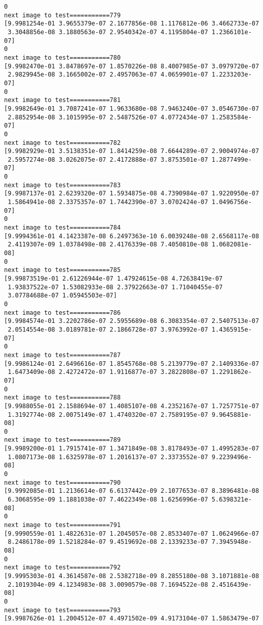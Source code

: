 \documentclass[11pt]{article}
\begin{document}
\begin{Verbatim}[commandchars=\\\{\}]
0
next image to test===========779
[9.9981254e-01 3.9655379e-07 2.1677856e-08 1.1176812e-06 3.4662733e-07
 3.3048856e-08 3.1880563e-07 2.9540342e-07 4.1195804e-07 1.2366101e-07]
0
next image to test===========780
[9.9982470e-01 3.8478697e-07 1.8570226e-08 8.4007985e-07 3.0979720e-07
 2.9829945e-08 3.1665002e-07 2.4957063e-07 4.0659901e-07 1.2233203e-07]
0
next image to test===========781
[9.9982649e-01 3.7087241e-07 1.9633680e-08 7.9463240e-07 3.0546730e-07
 2.8852954e-08 3.1015995e-07 2.5487526e-07 4.0772434e-07 1.2583584e-07]
0
next image to test===========782
[9.9982929e-01 3.5138351e-07 1.8414259e-08 7.6644289e-07 2.9004974e-07
 2.5957274e-08 3.0262075e-07 2.4172888e-07 3.8753501e-07 1.2877499e-07]
0
next image to test===========783
[9.9987137e-01 2.6239320e-07 1.5934875e-08 4.7390984e-07 1.9220950e-07
 1.5864941e-08 2.3375357e-07 1.7442390e-07 3.0702424e-07 1.0496756e-07]
0
next image to test===========784
[9.9994361e-01 4.1423387e-08 6.2497363e-10 6.0039248e-08 2.6568117e-08
 2.4119307e-09 1.0378498e-08 2.4176339e-08 7.4050810e-08 1.0682081e-08]
0
next image to test===========785
[9.99873519e-01 2.61226944e-07 1.47924615e-08 4.72638419e-07
 1.93837522e-07 1.53082933e-08 2.37922663e-07 1.71040455e-07
 3.07784688e-07 1.05945503e-07]
0
next image to test===========786
[9.9984574e-01 3.2202786e-07 2.5955689e-08 6.3083354e-07 2.5407513e-07
 2.0514554e-08 3.0189781e-07 2.1866728e-07 3.9763992e-07 1.4365915e-07]
0
next image to test===========787
[9.9986124e-01 2.6496616e-07 1.8545768e-08 5.2139779e-07 2.1409336e-07
 1.6473409e-08 2.4272472e-07 1.9116877e-07 3.2822808e-07 1.2291862e-07]
0
next image to test===========788
[9.9988055e-01 2.1588694e-07 1.4085107e-08 4.2352167e-07 1.7257751e-07
 1.3192774e-08 2.0075149e-07 1.4740320e-07 2.7589195e-07 9.9645881e-08]
0
next image to test===========789
[9.9989200e-01 1.7915741e-07 1.3471849e-08 3.8178493e-07 1.4995283e-07
 1.0807173e-08 1.6325978e-07 1.2016137e-07 2.3373552e-07 9.2239496e-08]
0
next image to test===========790
[9.9992085e-01 1.2136614e-07 6.6137442e-09 2.1077653e-07 8.3896481e-08
 6.3068595e-09 1.1881038e-07 7.4622349e-08 1.6256996e-07 5.6398321e-08]
0
next image to test===========791
[9.9990559e-01 1.4822631e-07 1.2045057e-08 2.8533407e-07 1.0624966e-07
 8.2486178e-09 1.5218284e-07 9.4519692e-08 2.1339233e-07 7.3945948e-08]
0
next image to test===========792
[9.9995303e-01 4.3614587e-08 2.5382718e-09 8.2855180e-08 3.1071881e-08
 2.1019304e-09 4.1234983e-08 3.0090579e-08 7.1694522e-08 2.4516439e-08]
0
next image to test===========793
[9.9987626e-01 1.2004512e-07 4.4971502e-09 4.9173104e-07 1.5863479e-07

\end{Verbatim}
\end{document}
